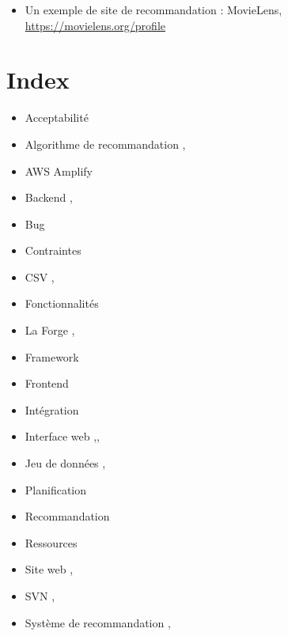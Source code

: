 \documentclass[a4paper,12pt]{report}
\begin{document}
\begin{itemize}
    \item Un exemple de site de recommandation : MovieLens,\\
    \url{https://movielens.org/profile}
\end{itemize}

\chapter*{Index}
\begin{itemize}
    \item Acceptabilité \pageref{acceptabilité}
    \item Algorithme de recommandation \pageref{algorec},\pageref{BE2}
    \item AWS Amplify \pageref{cont1}
    \item Backend \pageref{BE1},\pageref{BE2}
    \item Bug \pageref{BE2}
    \item Contraintes \pageref{cont1}
    \item CSV \pageref{JD2},\pageref{BE2}
    \item Fonctionnalités \pageref{fnct}
    \item La Forge \pageref{cont2},\pageref{BE2}
    \item Framework \pageref{BE2}
    \item Frontend \pageref{BE2}
    \item Intégration \pageref{BE2}
    \item Interface web \pageref{JD1},\pageref{fnct},\pageref{BE2}
    \item Jeu de données \pageref{JD1},\pageref{JD2}
    \item Planification \pageref{plan}
    \item Recommandation \pageref{algorec}
    \item Ressources \pageref{rssrc}
    \item Site web \pageref{SW},\pageref{BE2}
    \item SVN \pageref{cont2},\pageref{BE2}
    \item Système de recommandation \pageref{algorec},\pageref{BE2}
    
\end{itemize}
\end{document}
